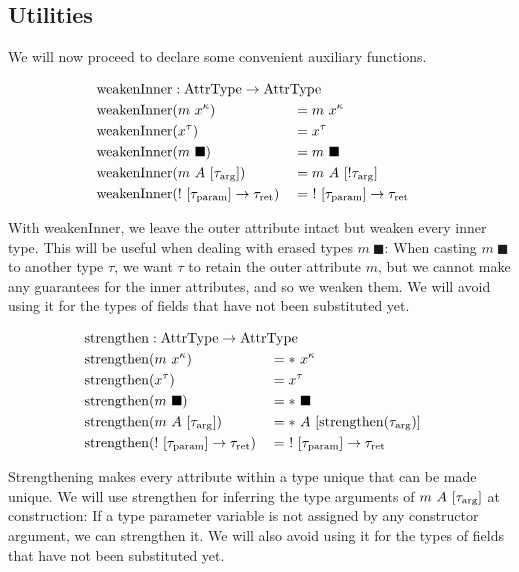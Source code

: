 \subsection{Utilities}
We will now proceed to declare some convenient auxiliary functions. 

\newcommand{\weakenInner}{\mathrm{weakenInner}}
\begin{alignat*}{3}
	\weakenInner &: \mathrlap{\AttrType \to \AttrType} \\
	\weakenInner&(m\ x^\kappa) &&= m\ x^\kappa \\
	\weakenInner&(x^\tau) &&= x^\tau \\
	\weakenInner&(m\ \blacksquare) &&= m\ \blacksquare \\
	\weakenInner&(m\ A\ [\tau_\arrg]) &&= m\ A\ [!\tau_\arrg] \\
	\weakenInner&(!\ [\tau_\param] \to \tau_\ret) &&=\ !\ [\tau_\param] \to \tau_\ret \\
\end{alignat*}

With weakenInner, we leave the outer attribute intact but weaken every inner type. This will be useful when dealing with erased types $m\ \blacksquare$: When casting $m\ \blacksquare$ to another type $\tau$, we want $\tau$ to retain the outer attribute $m$, but we cannot make any guarantees for the inner attributes, and so we weaken them. We will avoid using it for the types of fields that have not been substituted yet.

\newcommand{\strengthen}{\mathrm{strengthen}}

\begin{alignat*}{3}
  \strengthen &: \mathrlap{\AttrType \to \AttrType} \\
  \strengthen&(m\ x^\kappa) &&= *\ x^\kappa \\
  \strengthen&(x^\tau) &&= x^\tau \\
  \strengthen&(m\ \blacksquare) &&= *\ \blacksquare \\
  \strengthen&(m\ A\ [\tau_\arrg]) &&= *\ A\ [\strengthen(\tau_\arrg)] \\
  \strengthen&(!\ [\tau_\param] \to \tau_\ret) &&=\ !\ [\tau_\param] \to \tau_\ret \\
\end{alignat*}

Strengthening makes every attribute within a type unique that can be made unique. We will use strengthen for inferring the type arguments of $m\ A\ [\tau_{\mathrm{arg}}]$ at construction: If a type parameter variable is not assigned by any constructor argument, we can strengthen it. We will also avoid using it for the types of fields that have not been substituted yet.

